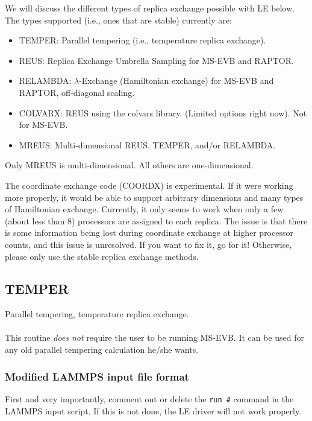 \documentclass[10pt]{article}
\begin{document}
We will discuss the different types of replica exchange possible with LE below.
The types supported (i.e., ones that are stable) currently are:
\begin{itemize}
	\item TEMPER: 	Parallel tempering (i.e., temperature replica exchange).
	\item REUS:		Replica Exchange Umbrella Sampling for MS-EVB and RAPTOR.
	\item RELAMBDA:	$\lambda$-Exchange (Hamiltonian exchange) for MS-EVB and RAPTOR, off-diagonal scaling.
	\item COLVARX:	REUS using the colvars library. (Limited options right now). Not for MS-EVB.
	\item MREUS:     Multi-dimensional REUS, TEMPER, and/or RELAMBDA.
\end{itemize}
Only MREUS is multi-dimensional. All others are one-dimensional.

The coordinate exchange code (COORDX) is experimental. If it were working more properly,
it would be able to support arbitrary dimensions and many types of Hamiltonian exchange. Currently,
it only seems to work when only a few (about less than 8) processors are assigned to each replica.
The issue is that there is some information being lost during coordinate exchange at higher processor
counts, and this issue is unresolved. If you want to fix it, go for it! Otherwise, please only use the stable
replica exchange methods.

\subsection{TEMPER}

Parallel tempering, temperature replica exchange.\\
\\
This routine {\em does not} require the user to be running MS-EVB. It can be used for any old parallel tempering calculation
he/she wants.

\subsubsection{Modified LAMMPS input file format}

First and very importantly, comment out
or delete the \texttt{run \#} command in the LAMMPS input script. If this is not done,
the LE driver will not work properly. 
\end{document}
